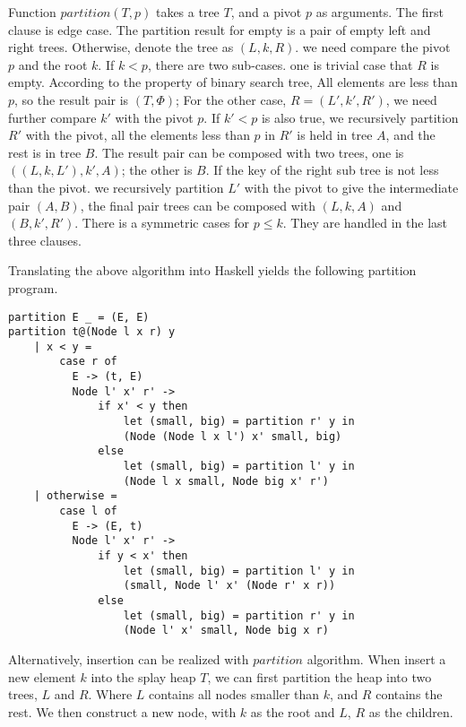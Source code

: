 \documentclass{article}
\begin{document}
Function $partition(T, p)$ takes a tree $T$, and a pivot $p$ as arguments.
The first clause is edge case. The partition result for empty is
a pair of empty left and right trees. Otherwise, denote the tree
as $(L, k, R)$. we need compare the pivot $p$ and the root $k$.
If $k < p$, there are two sub-cases. one is trivial case that
$R$ is empty. According to the property of binary search tree,
All elements are less than $p$, so the result pair is $(T, \Phi)$;
For the other case, $R = (L', k', R')$, we need further compare
$k'$ with the pivot $p$. If $k' < p$ is also true, we recursively
partition $R'$ with the pivot, all the elements less than $p$ in
$R'$ is held in tree $A$, and the rest is in tree $B$. The
result pair can be composed with two trees, one is $((L, k, L'), k', A)$;
the other is $B$. If the key of the right sub tree is not less than
the pivot. we recursively partition $L'$ with the pivot to give
the intermediate pair $(A, B)$, the final pair trees can be
composed with $(L, k, A)$ and $(B, k', R')$. There is a symmetric
cases for $p \leq k$. They are handled in the last three clauses.

Translating the above algorithm into Haskell yields the following partition
program.

\begin{lstlisting}
partition E _ = (E, E)
partition t@(Node l x r) y
    | x < y =
        case r of
          E -> (t, E)
          Node l' x' r' ->
              if x' < y then
                  let (small, big) = partition r' y in
                  (Node (Node l x l') x' small, big)
              else
                  let (small, big) = partition l' y in
                  (Node l x small, Node big x' r')
    | otherwise =
        case l of
          E -> (E, t)
          Node l' x' r' ->
              if y < x' then
                  let (small, big) = partition l' y in
                  (small, Node l' x' (Node r' x r))
              else
                  let (small, big) = partition r' y in
                  (Node l' x' small, Node big x r)
\end{lstlisting}

Alternatively, insertion can be realized with $partition$ algorithm.
When insert a new element $k$ into
the splay heap $T$, we can first partition the heap into two trees, $L$ and $R$. Where
$L$ contains all nodes smaller than $k$, and $R$ contains the rest.
We then construct a new node, with $k$ as the root and $L$, $R$ as the children.
\end{document}
